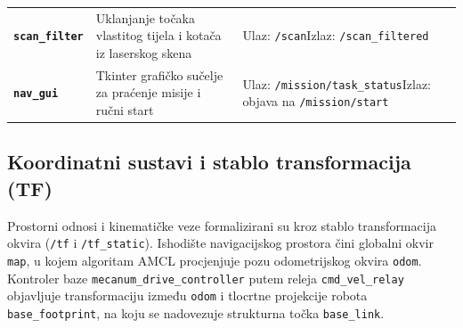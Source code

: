 \begin{table}[H]
\begin{tabularx}{\textwidth}{@{}>{\bfseries}p{2.8cm}>{\raggedright\arraybackslash}X>{\raggedright\arraybackslash}p{4.6cm}@{}}
    \texttt{scan\_filter} & Uklanjanje točaka vlastitog tijela i kotača iz laserskog skena & Ulaz: \texttt{/scan}\newline Izlaz: \texttt{/scan\_filtered} \\
    \texttt{nav\_gui} & Tkinter grafičko sučelje za praćenje misije i ručni start & Ulaz: \texttt{/mission/task\_status}\newline Izlaz: objava na \texttt{/mission/start} \\
    \bottomrule
  \end{tabularx}
\end{table}

\subsection{Koordinatni sustavi i stablo transformacija (TF)}
\label{sec:02-tf}

Prostorni odnosi i kinematičke veze formalizirani su kroz stablo transformacija okvira (\texttt{/tf}
i \texttt{/tf\_static}). Ishodište navigacijskog prostora čini globalni okvir \texttt{map}, u kojem
algoritam AMCL procjenjuje pozu odometrijskog okvira \texttt{odom}. Kontroler baze
\texttt{mecanum\_drive\_controller} putem releja \texttt{cmd\_vel\_relay} objavljuje transformaciju
između \texttt{odom} i tlocrtne projekcije robota \texttt{base\_footprint}, na koju se nadovezuje
strukturna točka \texttt{base\_link}.


